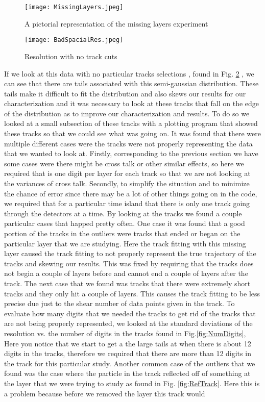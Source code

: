 \documentclass[./Thesis]{subfiles}
\begin{document}
\begin{figure}
	\centerline{\texttt{[image: MissingLayers.jpeg]}}
	\caption[Missing Layers]{ A pictorial representation of the missing layers experiment}
	\label{fig:Missing Layers}
\end{figure}

\begin{figure}
	\centerline{\texttt{[image: BadSpacialRes.jpeg]}}
	\caption[Spacial Resolution with no track cuts]{ Resolution with no track cuts}
	\label{fig:badRes}
\end{figure}


	 If we look at this data with no particular tracks selections , found in Fig. \ref{fig:badRes} , we can see that there are tails associated with this semi-gaussian distribution. These tails make it difficult to fit the distribution and also skews our results for our characterization and it was necessary to look at these tracks that fall on the edge of the distribution as to improve our characterization and results. To do so we looked at a small subsection of these tracks with a plotting program that showed these tracks so that we could see what was going on. It was found that there were multiple different cases were the tracks were not properly representing the data that we wanted to look at. Firstly, corresponding to the previous section we have some cases were there might be cross talk or other similar effects, so here we required that is one digit per layer for each track so that we are not looking at the variances of cross talk. Secondly, to simplify the situation and to minimize the chance of error since there may be a lot of other things going on in the code, we required that for a particular time island that there is only one track going through the detectors at a time. By looking at the tracks we found a couple particular cases that happed pretty often.  One case it was found that a good portion of the tracks in the outliers were tracks that ended or began on the particular layer that we are studying. Here the track fitting with this missing layer caused the track fitting to not properly represent the true trajectory of the tracks and skewing our results. This was fixed by requiring that the tracks does not begin a couple of layers before and cannot end a couple of layers after the track. The next case that we found was tracks that there were extremely short tracks and they only hit a couple of layers. This causes the track fitting to be less precise due just to the shear number of data points given in the track. To evaluate how many digits that we needed the tracks to get rid of the tracks that are not being properly represented, we looked at the standard deviations of the resolution vs. the number of digits in the tracks found in Fig.\ref{fig:NumDigits},  Here you notice that we start to get a the large tails at when there is about 12 digits in the tracks, therefore we required that there are more than 12 digits in the track for this particular study.  Another common case of the outliers that we found was the case where the particle in the track reflected off of something at the layer that we were trying to study as found in Fig. \ref{fig:RefTrack}. Here this is a problem because before we removed the layer this track would 
\end{document}
